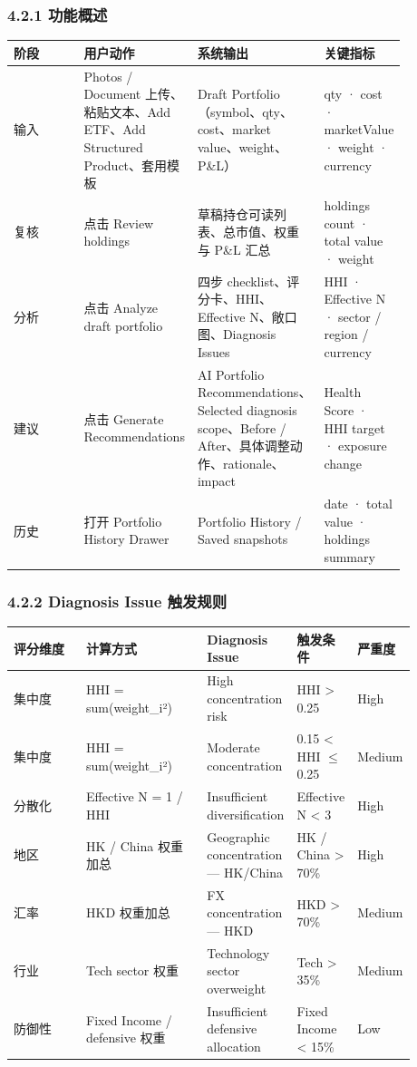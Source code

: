 \subsubsection{4.2.1 功能概述}

\begingroup
\small
\begin{longtable}{L{0.18\linewidth}L{0.24\linewidth}L{0.28\linewidth}L{0.16\linewidth}}
\toprule
\textbf{阶段} & \textbf{用户动作} & \textbf{系统输出} & \textbf{关键指标} \\
\midrule
输入 & Photos / Document 上传、粘贴文本、Add ETF、Add Structured Product、套用模板 & Draft Portfolio（symbol、qty、cost、market value、weight、P\&L） & qty · cost · marketValue · weight · currency \\
复核 & 点击 Review holdings & 草稿持仓可读列表、总市值、权重与 P\&L 汇总 & holdings count · total value · weight \\
分析 & 点击 Analyze draft portfolio & 四步 checklist、评分卡、HHI、Effective N、敞口图、Diagnosis Issues & HHI · Effective N · sector / region / currency \\
建议 & 点击 Generate Recommendations & AI Portfolio Recommendations、Selected diagnosis scope、Before / After、具体调整动作、rationale、impact & Health Score · HHI target · exposure change \\
历史 & 打开 Portfolio History Drawer & Portfolio History / Saved snapshots & date · total value · holdings summary \\
\bottomrule
\end{longtable}
\endgroup

\subsubsection{4.2.2 Diagnosis Issue 触发规则}

\begingroup
\small
\begin{longtable}{L{0.18\linewidth}L{0.30\linewidth}L{0.18\linewidth}L{0.12\linewidth}L{0.10\linewidth}}
\toprule
\textbf{评分维度} & \textbf{计算方式} & \textbf{Diagnosis Issue} & \textbf{触发条件} & \textbf{严重度} \\
\midrule
集中度 & HHI = sum(weight\_i²) & High concentration risk & HHI \textgreater{} 0.25 & High \\
集中度 & HHI = sum(weight\_i²) & Moderate concentration & 0.15 \textless{} HHI \ensuremath{\le} 0.25 & Medium \\
分散化 & Effective N = 1 / HHI & Insufficient diversification & Effective N \textless{} 3 & High \\
地区 & HK / China 权重加总 & Geographic concentration — HK/China & HK / China \textgreater{} 70\% & High \\
汇率 & HKD 权重加总 & FX concentration — HKD & HKD \textgreater{} 70\% & Medium \\
行业 & Tech sector 权重 & Technology sector overweight & Tech \textgreater{} 35\% & Medium \\
防御性 & Fixed Income / defensive 权重 & Insufficient defensive allocation & Fixed Income \textless{} 15\% & Low \\
\bottomrule
\end{longtable}
\endgroup

